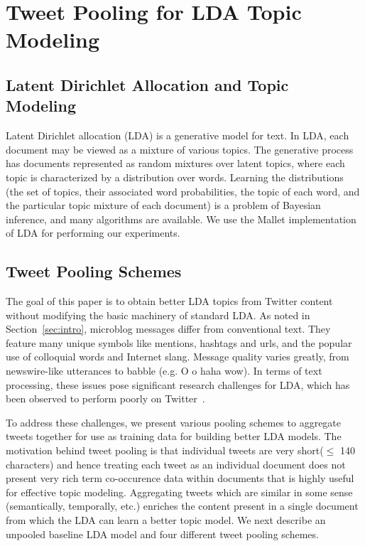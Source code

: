 \documentclass[10pt,a5paper,twoside]{article}
\begin{document}

\section{Tweet Pooling for LDA Topic Modeling}

\label{sec:pooling}

\subsection{Latent Dirichlet Allocation and Topic Modeling}

\label{subsec:lda}

Latent Dirichlet allocation (LDA) \cite{blei03} is a generative model
for text. In LDA, each document may be viewed as a mixture of various
topics.  The generative process has documents 
represented as random mixtures over latent topics, where each topic is
characterized by a distribution over words.  Learning the 
distributions (the set of topics, their associated word probabilities,
the topic of each word, and the particular topic mixture of each
document) is a problem of Bayesian inference, and many algorithms are
available.  We use the Mallet \cite{mallet} implementation of LDA for
performing our experiments.

\subsection{Tweet Pooling Schemes}

The goal of this paper is to obtain better LDA topics from Twitter
content without modifying the basic machinery of standard LDA.  As
noted in Section~\ref{sec:intro}, microblog messages differ from
conventional text. They feature many unique symbols like mentions,
hashtags and urls, and the popular use of colloquial words and
Internet slang. Message quality varies greatly, from newswire-like
utterances to babble (e.g. O o haha wow). In terms of text processing,
these issues pose significant research challenges for LDA, which has
been observed to perform poorly on Twitter~\cite{wayne}.

To address these challenges, we present various pooling schemes to
aggregate tweets together for use as training data for building better
LDA models. The motivation behind tweet pooling is that individual
tweets are very short($\leq$ 140 characters) and hence treating each
tweet as an individual document does not present very rich term
co-occurence data within documents that is highly useful for effective
topic modeling.  Aggregating tweets which are similar in some sense
(semantically, temporally, etc.) enriches the content present in a
single document from which the LDA can learn a better topic model.  We
next describe an unpooled baseline LDA model and four different tweet
pooling schemes.
\end{document}
